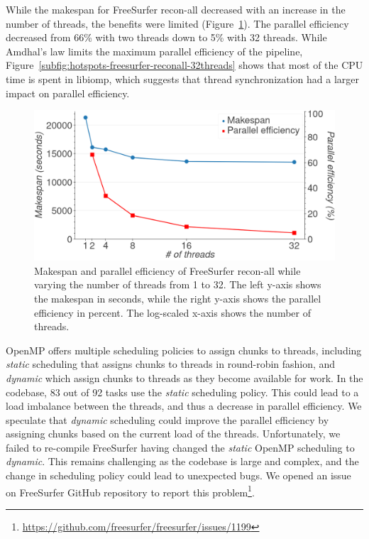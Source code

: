 \documentclass[conference]{IEEEtran}
\begin{document}
While the makespan for FreeSurfer recon-all decreased with an increase in the number of threads, the benefits were limited (Figure~\ref{fig:freesurfer-threading}). The parallel efficiency decreased from 66\% with two threads down to 5\% with 32 threads. While Amdhal's law limits the maximum parallel efficiency of the pipeline, Figure~\ref{subfig:hotspots-freesurfer-reconall-32threads} shows that most of the CPU time is spent in libiomp, which suggests that thread synchronization had a larger impact on parallel efficiency.

\begin{figure}
	\includegraphics[width=\linewidth]{figures/makespan-freesurfer.png}
	\caption{Makespan and parallel efficiency of FreeSurfer recon-all while varying the number of threads from 1 to 32. The left y-axis shows the makespan in seconds, while the right y-axis shows the parallel efficiency in percent. The log-scaled x-axis shows the number of threads.}
	\label{fig:freesurfer-threading}
\end{figure}

OpenMP offers multiple scheduling policies to assign chunks to threads, including \textit{static} scheduling that assigns chunks to threads in round-robin fashion, and \textit{dynamic} which assign chunks to threads as they become available for work. In the codebase, 83 out of 92 tasks use the \textit{static} scheduling policy. This could lead to a load imbalance between the threads, and thus a decrease in parallel efficiency. We speculate that \textit{dynamic} scheduling could improve the parallel efficiency by assigning chunks based on the current load of the threads. Unfortunately, we failed to re-compile FreeSurfer having changed the \textit{static} OpenMP scheduling to \textit{dynamic}. This remains challenging as the codebase is large and complex, and the change in scheduling policy could lead to unexpected bugs. We opened an issue on FreeSurfer GitHub repository to report this problem\footnote{\href{https://github.com/freesurfer/freesurfer/issues/1199}{https://github.com/freesurfer/freesurfer/issues/1199}}.
\end{document}
